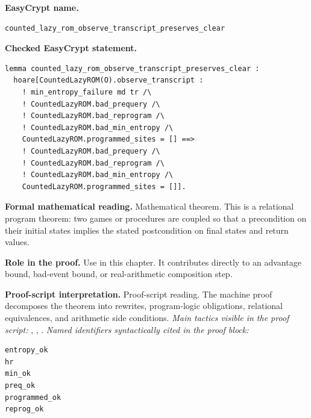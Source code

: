\begin{formaltheorem}
\noindent\textbf{EasyCrypt name.}
\begin{lstlisting}[language=EasyCrypt,basicstyle=\ttfamily\scriptsize]
counted_lazy_rom_observe_transcript_preserves_clear
\end{lstlisting}
\noindent\textbf{Checked EasyCrypt statement.}
\begin{lstlisting}[language=EasyCrypt,basicstyle=\ttfamily\scriptsize]
lemma counted_lazy_rom_observe_transcript_preserves_clear :
  hoare[CountedLazyROM(O).observe_transcript :
    ! min_entropy_failure md tr /\
    ! CountedLazyROM.bad_prequery /\
    ! CountedLazyROM.bad_reprogram /\
    ! CountedLazyROM.bad_min_entropy /\
    CountedLazyROM.programmed_sites = [] ==>
    ! CountedLazyROM.bad_prequery /\
    ! CountedLazyROM.bad_reprogram /\
    ! CountedLazyROM.bad_min_entropy /\
    CountedLazyROM.programmed_sites = []].
\end{lstlisting}
\noindent\textbf{Formal mathematical reading.}
Mathematical theorem. This is a relational program theorem: two games or procedures are coupled so that a precondition on their initial states implies the stated postcondition on final states and return values.

\noindent\textbf{Role in the proof.}
Use in this chapter. It contributes directly to an advantage bound, bad-event bound, or real-arithmetic composition step.

\noindent\textbf{Proof-script interpretation.}
Proof-script reading. The machine proof decomposes the theorem into rewrites, program-logic obligations, relational equivalences, and arithmetic side conditions.
\emph{Main tactics visible in the proof script:} \ec{proc}, \ec{wp}, \ec{rewrite}.
\emph{Named identifiers syntactically cited in the proof block:}
\begin{lstlisting}[language=EasyCrypt,basicstyle=\ttfamily\scriptsize]
entropy_ok
hr
min_ok
preq_ok
programmed_ok
reprog_ok
\end{lstlisting}

\end{formaltheorem}

